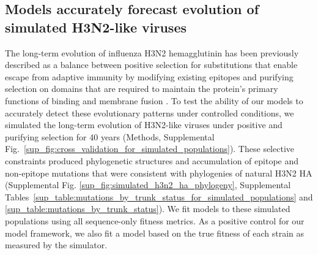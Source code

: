 \subsection*{Models accurately forecast evolution of simulated H3N2-like viruses}

The long-term evolution of influenza H3N2 hemagglutinin has been previously described as a balance between positive selection for substitutions that enable escape from adaptive immunity by modifying existing epitopes and purifying selection on domains that are required to maintain the protein's primary functions of binding and membrane fusion \cite{Bush:1999vj,Neher2013,Luksza:2014hj,Koelle:2015dh}.
To test the ability of our models to accurately detect these evolutionary patterns under controlled conditions, we simulated the long-term evolution of H3N2-like viruses under positive and purifying selection for 40 years (Methods, Supplemental Fig.~\ref{sup_fig:cross_validation_for_simulated_populations}).
These selective constraints produced phylogenetic structures and accumulation of epitope and non-epitope mutations that were consistent with phylogenies of natural H3N2 HA (Supplemental Fig. \ref{sup_fig:simulated_h3n2_ha_phylogeny}, Supplemental Tables~\ref{sup_table:mutations_by_trunk_status_for_simulated_populations} and \ref{sup_table:mutations_by_trunk_status}).
We fit models to these simulated populations using all sequence-only fitness metrics.
As a positive control for our model framework, we also fit a model based on the true fitness of each strain as measured by the simulator.

